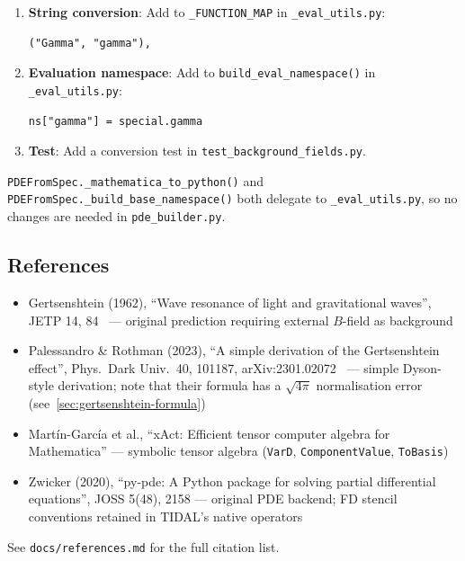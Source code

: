 \begin{enumerate}
  \item \textbf{String conversion}: Add to \texttt{\_FUNCTION\_MAP} in \texttt{\_eval\_utils.py}:

\begin{lstlisting}[style=python]
("Gamma", "gamma"),
\end{lstlisting}

  \item \textbf{Evaluation namespace}: Add to \texttt{build\_eval\_namespace()} in \texttt{\_eval\_utils.py}:

\begin{lstlisting}[style=python]
ns["gamma"] = special.gamma
\end{lstlisting}

  \item \textbf{Test}: Add a conversion test in \texttt{test\_background\_fields.py}.
\end{enumerate}

\texttt{PDEFromSpec.\_mathematica\_to\_python()} and \texttt{PDEFromSpec.\_build\_base\_namespace()}
both delegate to \texttt{\_eval\_utils.py}, so no changes are needed in \texttt{pde\_builder.py}.

\subsection{References}
\label{sec:bg-references}

\begin{itemize}
  \item Gertsenshtein (1962), ``Wave resonance of light and gravitational waves'', JETP 14, 84~\cite{gertsenshtein1962wave} --- original prediction requiring external $B$-field as background
  \item Palessandro \& Rothman (2023), ``A simple derivation of the Gertsenshtein effect'', Phys.\ Dark Univ.\ 40, 101187, arXiv:2301.02072~\cite{palessandro2023simple} --- simple Dyson-style derivation; note that their formula has a $\sqrt{4\pi}$ normalisation error (see~\cref{sec:gertsenshtein-formula})
  \item Mart\'in-Garc\'ia et al., ``xAct: Efficient tensor computer algebra for Mathematica'' --- symbolic tensor algebra (\texttt{VarD}, \texttt{ComponentValue}, \texttt{ToBasis})
  \item Zwicker (2020), ``py-pde: A Python package for solving partial differential equations'', JOSS 5(48), 2158 --- original PDE backend; FD stencil conventions retained in TIDAL's native operators
\end{itemize}

See \texttt{docs/references.md} for the full citation list.
